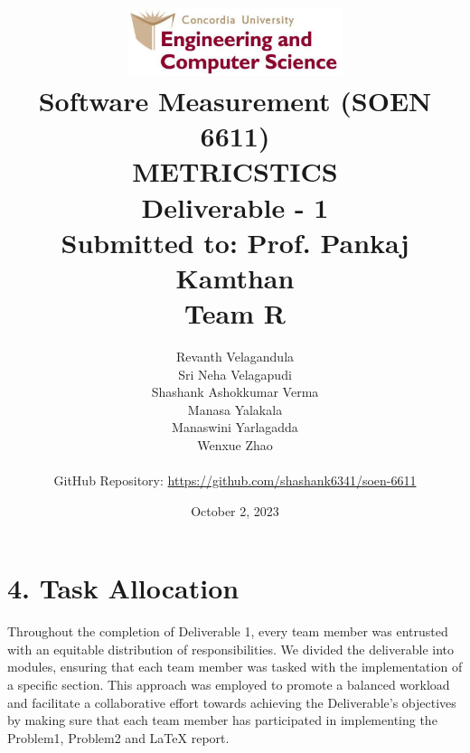 \documentclass[letterpaper]{report}
\begin{document}
\setcounter{secnumdepth}{0}
\begin{titlepage}
\title{\includegraphics[height=2.0cm]{concordia_comp.png}
\vspace{2cm}\\Software Measurement (SOEN 6611)\\[.5em]
METRICSTICS\\[.5em]
Deliverable - 1\\[.5em]
{\fontsize{15}{8}\selectfont Submitted to: Prof. Pankaj Kamthan} \\
\vspace{1cm}
{\fontsize{15}{8}\selectfont \textbf {Team R}}
}
\author{Revanth Velagandula\\
Sri Neha Velagapudi \\
Shashank Ashokkumar Verma\\
Manasa Yalakala\\
Manaswini Yarlagadda\\
Wenxue Zhao\\
\\
\vspace{1cm}
\textnormal{GitHub Repository:}
\url{https://github.com/shashank6341/soen-6611}
}
\date{October 2, 2023\\[.5em]}

\end{titlepage}


\maketitle
\tableofcontents

\pagebreak

\pagebreak




\clearpage
{}
\section{4. Task Allocation}
Throughout the completion of Deliverable 1, every team member was entrusted with an equitable distribution of responsibilities. We divided the deliverable into modules, ensuring that each team member was tasked with the implementation of a specific section. This approach was employed to promote a balanced workload and facilitate a collaborative effort towards achieving the Deliverable's objectives by making sure that each team member has participated in implementing the Problem1, Problem2 and LaTeX report.
\end{document}
